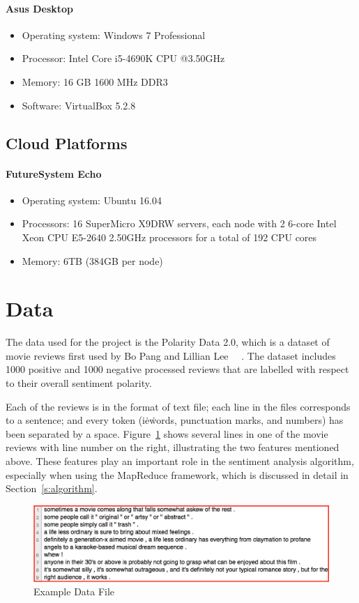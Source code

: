 \paragraph{Asus Desktop}
\begin{itemize}
	\item Operating system: Windows 7 Professional
	\item Processor: Intel Core i5-4690K CPU @3.50GHz
	\item Memory: 16 GB 1600 MHz DDR3
	\item Software: VirtualBox 5.2.8
\end{itemize}

\subsection{Cloud Platforms}
\paragraph{FutureSystem Echo}
\begin{itemize}
	\item Operating system: Ubuntu 16.04
	\item Processors: 16 SuperMicro X9DRW servers, each node
        with 2 6-core Intel Xeon CPU E5-2640 2.50GHz
        processors for a total of 192 CPU cores
	\item Memory: 6TB (384GB per node)
\end{itemize}


\section{Data}\label{s:data}

The data used for the project is the Polarity Data 2.0, which is a
dataset of movie reviews first used by Bo Pang and Lillian
Lee~\cite{hid-sp18-405-sentiment-pang2004asentimental}
~\cite{hid-sp18-405-sentiment-pang2002thumbs}.
The dataset includes 1000 positive and 1000 negative processed
reviews that  are labelled with respect to their overall sentiment
polarity.

Each of the reviews is in the format of text file; each line in the
files corresponds to a sentence; and every token (i\.e\. words,
punctuation marks, and numbers) has been separated by a
space. Figure~\ref{f:data} shows several lines in one of the movie
reviews with line number on the right, illustrating the two features
mentioned above. These features play an important role in the
sentiment analysis algorithm, especially when using the MapReduce
framework, which is discussed in detail in Section~\ref{s:algorithm}.
\begin{figure}[!ht]
	\centering\includegraphics[width=\columnwidth]{images/polarity-data.png}
	\caption{Example Data File}\label{f:data}
\end{figure}

